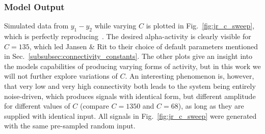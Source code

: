 \subsubsection{Model Output}
Simulated data from $y_1-y_2$ while varying $C$ is plotted in Fig.~\ref{fig:jr_c_sweep},
which is perfectly reproducing~\cite[Fig. 3]{jansen_electroencephalogram_1995}.
The desired alpha-activity is clearly visible for $C = 135$,
which led Jansen \& Rit to their choice of default parameters mentioned in Sec.~\ref{subsubsec:connectivity_constants}.
The other plots give an insight into the models capabilities of producing varying forms of activity,
but in this work we will not further explore variations of $C$.
An interesting phenomenon is, however,
that very low and very high connectivity both leads to the system being entirely noise-driven,
which produces signals with identical form, but different amplitude for different values of $C$ (compare $C=1350$ and $C=68$),
as long as they are supplied with identical input.
All signals in Fig.~\ref{fig:jr_c_sweep} were generated with the same pre-sampled random input.

